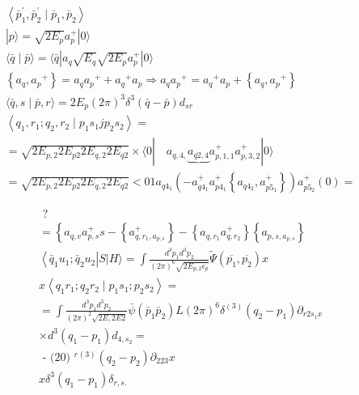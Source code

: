 \documentclass[10pt]{article}
\begin{document}
\[
\begin{aligned}
& \left\langle\bar{p}_{1}^{\prime}, \bar{p}_{2}^{\prime} \mid \bar{p}_{1}, \bar{p}_{2}\right\rangle \\
& |p\rangle=\sqrt{2 E_{p}} a_{p}^{+}|0\rangle \\
& \langle\bar{q} \mid \bar{p}\rangle=\langle\bar{q}| a_{q} \sqrt{E_{q}} \sqrt{2 E_{p}} a_{p}^{+}|0\rangle \\
& \left\{a_{q}, a_{p}{ }^{+}\right\}=a_{q} a_{p}{ }^{+}+a_{q}{ }^{+} a_{p} \Rightarrow a_{q} a_{p}{ }^{+}=a_{q}{ }^{+} a_{p}+\left\{a_{q}, a_{p}{ }^{+}\right\} \\
& \langle\bar{q}, s \mid \bar{p}, r\rangle=2 E_{p}(2 \pi)^{3} \delta^{3}(\bar{q}-\bar{p}) d_{s r} \\
& \left\langle q_{1}, r_{1} ; q_{2}, r_{2} \mid p_{1} s_{1} j p_{2} s_{2}\right\rangle= \\
& =\sqrt{2 E_{p, 2} 2 E_{p 2} 2 E_{q, 2} 2 E_{q 2}} \times\langle 0| \quad a_{q, 4,} \underbrace{a_{q 2,4}} a_{p, 1,1}^{+} a_{p, 3,2}^{+}|0\rangle \\
& =\sqrt{2 E_{p, 2} 2 E_{p 2} 2 E_{q, 2} 2 E_{q 2}}<01 a_{q 4_{1}}\left(-a_{q 4_{1}}^{+} a_{p 4_{1}}^{+}\left\{a_{q 4_{2}}, a_{p 5_{1}}^{+}\right\}\right) a_{p 5_{2}}^{+}(0)=
\end{aligned}
\]

\[
\begin{aligned}
& \text { ? } \\
& =\left\{a_{q, v} a_{p, s}^{+} s-\left\{a_{q, r_{1}, a_{p, s}}^{+}\right\}-\left\{a_{q, r_{1}} a_{q, r_{2}}^{+}\right\}\left\{a_{p, s, a_{p, s}}\right\}\right. \\
& \left\langle\bar{q}_{1} u_{1} ; \bar{q}_{2} u_{2}\right| S|H\rangle=\int \frac{d^{3} p_{1} d^{3} p_{2}}{(2 \pi)^{6} \sqrt{2 E_{p, 2} \epsilon_{p}}} \tilde{\Psi}\left(\overline{p_{1}}, \overline{p_{2}}\right) x \\
& x\left\langle q_{1} r_{1} ; q_{2} r_{2} \mid p_{1} s_{1} ; p_{2} s_{2}\right\rangle= \\
& =\int \frac{d^{3} p_{1} d^{3} p_{2}}{(2 \pi)^{2} \sqrt{2 E, 2 E 2}} \bar{\psi}\left(\bar{p}_{1} \bar{p}_{2}\right) L(2 \pi)^{6} \delta^{(3)}\left(q_{2}-p_{1}\right) \partial_{r 2 s_{1} x} \\
& \times d^{3}\left(q_{1}-p_{1}\right) d_{4, s_{2}}= \\
& \text { - (20) }{ }^{r}{ }^{(3)}\left(q_{2}-p_{2}\right) \partial_{223} x \\
& x \delta^{3}\left(q_{1}-p_{1}\right) \delta_{r, s .}
\end{aligned}
\]
\end{document}
